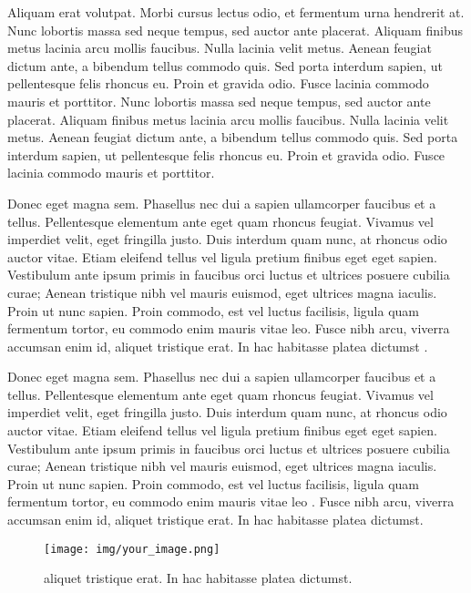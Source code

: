 \documentclass[11pt]{article}
\begin{document}
Aliquam erat volutpat. Morbi cursus lectus odio, et fermentum urna hendrerit at. Nunc lobortis massa sed neque tempus, sed auctor ante placerat. Aliquam finibus metus lacinia arcu mollis faucibus. Nulla lacinia velit metus. Aenean feugiat dictum ante, a bibendum tellus commodo quis. Sed porta interdum sapien, ut pellentesque felis rhoncus eu. Proin et gravida odio. Fusce lacinia commodo mauris et porttitor. Nunc lobortis massa sed neque tempus, sed auctor ante placerat. Aliquam finibus metus lacinia arcu mollis faucibus. Nulla lacinia velit metus. Aenean feugiat dictum ante, a bibendum tellus commodo quis. Sed porta interdum sapien, ut pellentesque felis rhoncus eu. Proin et gravida odio. Fusce lacinia commodo mauris et porttitor.


Donec eget magna sem. Phasellus nec dui a sapien ullamcorper faucibus et a tellus. Pellentesque elementum ante eget quam rhoncus feugiat. Vivamus vel imperdiet velit, eget fringilla justo. Duis interdum quam nunc, at rhoncus odio auctor vitae. Etiam eleifend tellus vel ligula pretium finibus eget eget sapien. Vestibulum ante ipsum primis in faucibus orci luctus et ultrices posuere cubilia curae; Aenean tristique nibh vel mauris euismod, eget ultrices magna iaculis. Proin ut nunc sapien. Proin commodo, est vel luctus facilisis, ligula quam fermentum tortor, eu commodo enim mauris vitae leo. Fusce nibh arcu, viverra accumsan enim id, aliquet tristique erat. In hac habitasse platea dictumst \cite{who_2021}. 

Donec eget magna sem. Phasellus nec dui a sapien ullamcorper faucibus et a tellus. Pellentesque elementum ante eget quam rhoncus feugiat. Vivamus vel imperdiet velit, eget fringilla justo. Duis interdum quam nunc, at rhoncus odio auctor vitae. Etiam eleifend tellus vel ligula pretium finibus eget eget sapien. Vestibulum ante ipsum primis in faucibus orci luctus et ultrices posuere cubilia curae; Aenean tristique nibh vel mauris euismod, eget ultrices magna iaculis. Proin ut nunc sapien. Proin commodo, est vel luctus facilisis, ligula quam fermentum tortor, eu commodo enim mauris vitae leo \cite{berger2021confidence}. Fusce nibh arcu, viverra accumsan enim id, aliquet tristique erat. In hac habitasse platea dictumst. 

\begin{figure}[H]
    \centering
    \texttt{[image: img/your\_image.png]}
    \caption{ aliquet tristique erat. In hac habitasse platea dictumst. }
    \label{fig:bad_images}
\end{figure}
\end{document}
